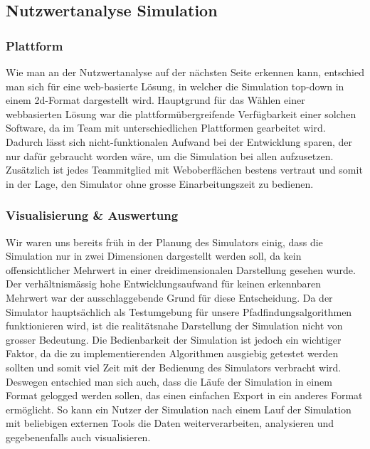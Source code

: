 \documentclass[main.tex]{subfiles} %
\begin{document}

\subsection{Nutzwertanalyse Simulation}

\subsubsection{Plattform}
Wie man an der Nutzwertanalyse auf der nächsten Seite erkennen kann, entschied man
sich für eine web-basierte Lösung, in welcher die Simulation top-down in einem 2d-Format dargestellt wird.
Hauptgrund für das Wählen einer webbasierten Lösung war die plattformübergreifende Verfügbarkeit einer
solchen Software, da im Team mit unterschiedlichen Plattformen gearbeitet wird. Dadurch lässt sich
nicht-funktionalen Aufwand bei der Entwicklung sparen, der nur dafür gebraucht worden wäre, um die Simulation
bei allen aufzusetzen. Zusätzlich ist jedes Teammitglied mit Weboberflächen bestens vertraut und somit in
der Lage, den Simulator ohne grosse Einarbeitungszeit zu bedienen.

\subsubsection{Visualisierung \& Auswertung}
Wir waren uns bereits früh in der Planung des Simulators einig, dass
die Simulation nur in zwei Dimensionen dargestellt werden soll, da kein offensichtlicher Mehrwert in einer
dreidimensionalen Darstellung gesehen wurde. Der verhältnismässig hohe Entwicklungsaufwand für keinen erkennbaren
Mehrwert war der ausschlaggebende Grund für diese Entscheidung. Da der Simulator hauptsächlich als
Testumgebung für unsere Pfadfindungsalgorithmen funktionieren wird, ist die realitätsnahe Darstellung der Simulation
nicht von grosser Bedeutung. Die Bedienbarkeit der Simulation ist jedoch ein wichtiger Faktor, da
die zu implementierenden Algorithmen ausgiebig getestet werden sollten und somit viel Zeit mit der Bedienung des Simulators verbracht wird.
Deswegen entschied man sich auch, dass die Läufe der Simulation in einem Format gelogged werden sollen, das einen
einfachen Export in ein anderes Format ermöglicht. So kann ein Nutzer der Simulation nach einem Lauf der Simulation mit
beliebigen externen Tools die Daten weiterverarbeiten, analysieren und gegebenenfalls auch visualisieren.
\end{document}
